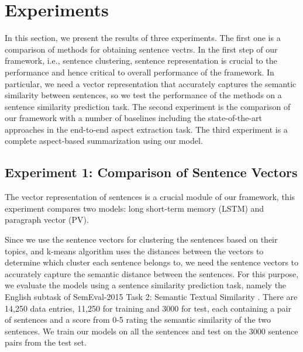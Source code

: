 \section{Experiments}
\label{sec:experiments}

In this section, we present the results of three experiments. 
The first one is a comparison of methods for obtaining sentence vectrs. 
In the first step of our framework, i.e., sentence clustering, 
sentence representation is crucial to the performance 
and hence critical to overall performance of the framework. 
In particular, we need a vector representation 
that accurately captures the semantic similarity between sentences, 
so we test the performance of the methods on a sentence similarity 
prediction task. 
The second experiment is the comparison of our framework
with a number of baselines including the state-of-the-art approaches
in the end-to-end aspect extraction task.
The third experiment is a complete aspect-based summarization using our model.

\subsection{Experiment 1: Comparison of Sentence Vectors}

The vector representation of sentences is a crucial module of our framework, 
this experiment compares two models: long short-term memory (LSTM) and 
paragraph vector (PV). 

Since we use the sentence vectors for clustering the sentences based on 
their topics, and k-means algorithm uses the distances between the 
vectors to determine which cluster each sentence belongs to, 
we need the sentence vectors to accurately capture the semantic distance 
between the sentences. 
For this purpose, we evaluate the models using
a sentence similarity prediction task, namely the English subtask of 
SemEval-2015 Task 2: Semantic Textual Similarity \cite{agirrea2015semeval}.
There are 14,250 data entries, 11,250 for training and 3000 for test,
each containing a pair of sentences and a score from 0-5 rating 
the semantic similarity of the two sentences.
We train our models on all the sentences and 
test on the 3000 sentence pairs from the test set.

